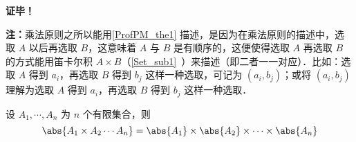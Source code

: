 \textbf{证毕！}

\textbf{注：}乘法原则之所以能用\autoref{ProfPM_the1} 描述，是因为在乘法原则的描述中，选取 $A$ 以后再选取 $B$，这意味着 $A$ 与 $B$ 是有顺序的，这便使得选取 $A$ 再选取 $B$ 的方式能用笛卡尔积 $A\times B$（\autoref{Set_sub1}~）来描述（即二者一一对应）．比如：选取 $A$ 得到 $a_i$，再选取 $B$ 得到 $b_j$ 这样一种选取，可记为 $(a_i,b_j)$；或将 $(a_i,b_j)$ 理解为选取 $A$ 得到 $a_i$，再选取 $B$ 得到 $b_j$ 这样一种选取．
\begin{corollary}{}
设 $A_1,\cdots,A_n$ 为 $n$ 个有限集合，则
\begin{equation}
\abs{A_1\times A_2\cdots A_n}=\abs{A_1}\times\abs{A_2}\times\cdots\times\abs{A_n}
\end{equation}

\end{corollary}